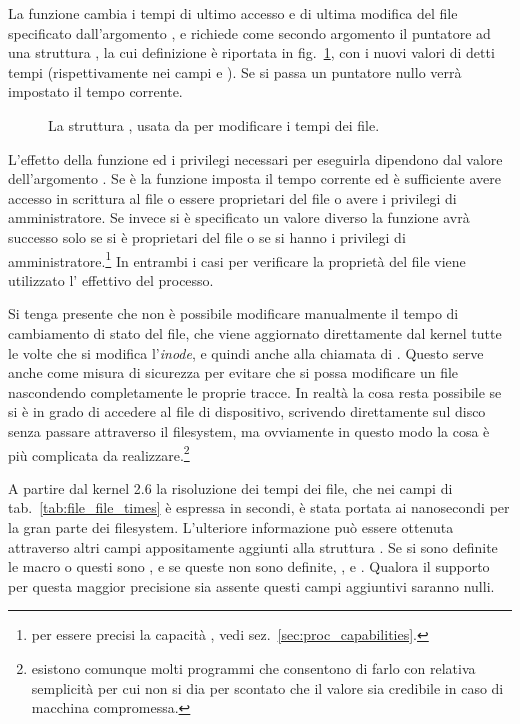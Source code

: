 La funzione cambia i tempi di ultimo accesso e di ultima modifica del file
specificato dall'argomento , e richiede come secondo argomento
il puntatore ad una struttura , la cui definizione è riportata
in fig.~\ref{fig:struct_utimebuf}, con i nuovi valori di detti tempi
(rispettivamente nei campi  e ). Se si passa un
puntatore nullo verrà impostato il tempo corrente.

\begin{figure}[!htb]
  \footnotesize \centering
  \begin{minipage}[c]{0.8\textwidth}
  \end{minipage} 
  \normalsize 
  \caption{La struttura , usata da  per modificare
    i tempi dei file.}
  \label{fig:struct_utimebuf}
\end{figure}

L'effetto della funzione ed i privilegi necessari per eseguirla dipendono dal
valore dell'argomento . Se è  la funzione imposta il
tempo corrente ed è sufficiente avere accesso in scrittura al file o essere
proprietari del file o avere i privilegi di amministratore. Se invece si è
specificato un valore diverso la funzione avrà successo solo se si è
proprietari del file o se si hanno i privilegi di amministratore.\footnote{per
  essere precisi la capacità , vedi
  sez.~\ref{sec:proc_capabilities}.} In entrambi i casi per verificare la
proprietà del file viene utilizzato l' effettivo del processo.

Si tenga presente che non è possibile modificare manualmente il tempo di
cambiamento di stato del file, che viene aggiornato direttamente dal kernel
tutte le volte che si modifica l'\textit{inode}, e quindi anche alla chiamata
di .  Questo serve anche come misura di sicurezza per evitare che
si possa modificare un file nascondendo completamente le proprie tracce. In
realtà la cosa resta possibile se si è in grado di accedere al file di
dispositivo, scrivendo direttamente sul disco senza passare attraverso il
filesystem, ma ovviamente in questo modo la cosa è più complicata da
realizzare.\footnote{esistono comunque molti programmi che consentono di farlo
  con relativa semplicità per cui non si dia per scontato che il valore sia
  credibile in caso di macchina compromessa.}

A partire dal kernel 2.6 la risoluzione dei tempi dei file, che nei campi di
tab.~\ref{tab:file_file_times} è espressa in secondi, è stata portata ai
nanosecondi per la gran parte dei filesystem. L'ulteriore informazione può
essere ottenuta attraverso altri campi appositamente aggiunti alla struttura
. Se si sono definite le macro  o
 questi sono ,
 e  se queste non sono definite,
,  e . Qualora il
supporto per questa maggior precisione sia assente questi campi aggiuntivi
saranno nulli.

